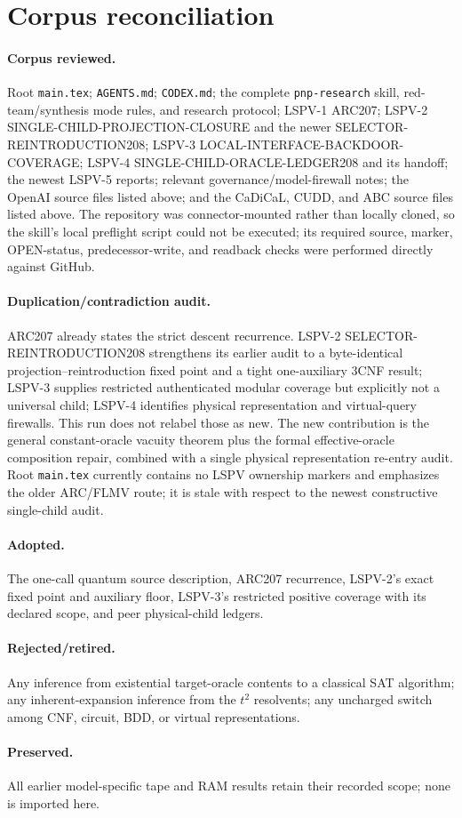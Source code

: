 \documentclass[11pt]{article}
\begin{document}
\section{Corpus reconciliation}
\paragraph{Corpus reviewed.} Root \texttt{main.tex}; \texttt{AGENTS.md};
\texttt{CODEX.md}; the complete \texttt{pnp-research} skill, red-team/synthesis
mode rules, and research protocol; LSPV-1 ARC207; LSPV-2
SINGLE-CHILD-PROJECTION-CLOSURE and the newer SELECTOR-REINTRODUCTION208;
LSPV-3 LOCAL-INTERFACE-BACKDOOR-COVERAGE; LSPV-4
SINGLE-CHILD-ORACLE-LEDGER208 and its
handoff; the newest LSPV-5 reports; relevant governance/model-firewall notes;
the OpenAI source files listed above; and the CaDiCaL, CUDD, and ABC source
files listed above.  The repository was connector-mounted rather than locally
cloned, so the skill's local preflight script could not be executed; its
required source, marker, OPEN-status, predecessor-write, and readback checks
were performed directly against GitHub.
\paragraph{Duplication/contradiction audit.} ARC207 already states the strict
descent recurrence.  LSPV-2 SELECTOR-REINTRODUCTION208 strengthens its earlier
audit to a byte-identical projection--reintroduction fixed point and a tight
one-auxiliary 3CNF result; LSPV-3 supplies restricted authenticated modular
coverage but explicitly not a universal child; LSPV-4 identifies physical
representation and virtual-query firewalls.  This run does not relabel those
as new.  The new
contribution is the general constant-oracle vacuity theorem plus the formal
effective-oracle composition repair, combined with a single physical
representation re-entry audit.  Root \texttt{main.tex} currently contains no
LSPV ownership markers and emphasizes the older ARC/FLMV route; it is stale
with respect to the newest constructive single-child audit.
\paragraph{Adopted.} The one-call quantum source description, ARC207 recurrence,
LSPV-2's exact fixed point and auxiliary floor, LSPV-3's restricted positive
coverage with its declared scope, and peer physical-child ledgers.
\paragraph{Rejected/retired.} Any inference
from existential target-oracle contents to a classical SAT algorithm; any
inherent-expansion inference from the $t^2$ resolvents; any uncharged switch
among CNF, circuit, BDD, or virtual representations.  \paragraph{Preserved.}
All earlier model-specific tape and RAM results retain their recorded scope;
none is imported here.
\end{document}
